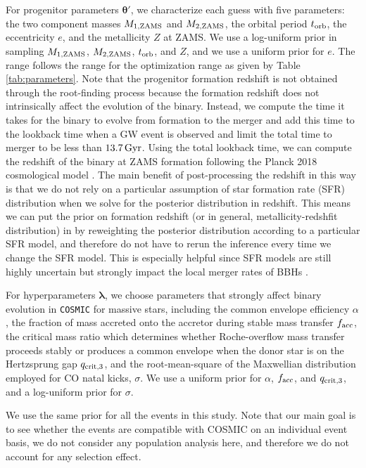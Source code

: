 \documentclass[linenumbers,twocolumn]{aastex631}
\begin{document}
For progenitor parameters $\bm{\theta'}$, we characterize each guess with five
parameters: the two component masses $M_{\rm 1,ZAMS}$ and $M_{\rm 2,ZAMS}$, the
orbital period $t_{\rm orb}$, the eccentricity $e$, and the metallicity $Z$ at
ZAMS. We use a log-uniform prior in sampling $M_{\rm 1,ZAMS}$, $M_{\rm
2,ZAMS}$, $t_{\rm orb}$, and $Z$, and we use a uniform prior for $e$.
The range follows the range for the optimization range as given by Table
\ref{tab:parameters}. Note that the progenitor formation redshift is not
obtained through the root-finding process because the formation redshift does
not intrinsically affect the evolution of the binary. Instead, we compute the
time it takes for the binary to evolve from formation to the merger and add this
time to the lookback time when a GW event is observed and limit the total time
to merger to be less than $13.7\,\rm{Gyr}$. Using the total lookback time, we
can compute the redshift of the binary at ZAMS formation following the Planck
2018 cosmological model \citep{Planck2018}. The main benefit of post-processing
the redshift in this way is that we do not rely on a particular assumption of
star formation rate (SFR) distribution when we solve for the posterior
distribution in redshift. This means we can put the prior on formation redshift
(or in general, metallicity-redshfit distribution) in by reweighting the
posterior distribution according to a particular SFR model, and therefore do not
have to rerun the inference every time we change the SFR model. This is
especially helpful since SFR models are still highly uncertain but strongly
impact the local merger rates of BBHs \citep[e.g. ][]{Broekgaarden2021}.

For hyperparameters $\bm{\lambda}$, we choose parameters that strongly affect
binary evolution in \texttt{COSMIC} for massive stars, including the common
envelope efficiency $\alpha$, the fraction of mass accreted onto the accretor
during stable mass transfer $f_{\rm acc}$, the critical mass ratio which
determines whether Roche-overflow mass transfer proceeds stably or produces a
common envelope when the donor star is on the Hertzsprung gap $q_{\rm crit,3}$,
and the root-mean-square of the Maxwellian distribution employed for CO natal
kicks, $\sigma$. We use a uniform prior for $\alpha$, $f_{\rm acc}$, and
$q_{\rm crit,3}$, and a log-uniform prior for $\sigma$.

We use the same prior for all the events in this study. Note that our
main goal is to see whether the events are compatible with \textsc{COSMIC} on an
individual event basis, we do not consider any population analysis here, and
therefore we do not account for any selection effect.
\end{document}
